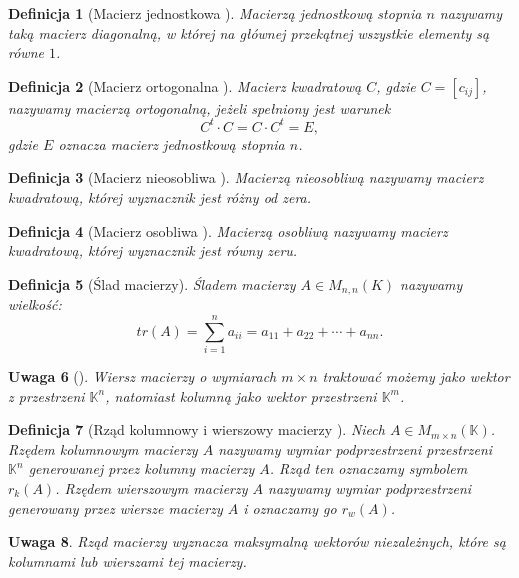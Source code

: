 \documentclass[12pt,a4paper]{report}
\newtheorem{df}{Definicja}[chapter]
\newtheorem{uwaga}[df]{Uwaga}
\newcommand{\setK}{\mathbb{K}}
\begin{document}
\begin{df}[Macierz jednostkowa {\citep[Sec 8.1]{alzega}}]
Macierzą jednostkową stopnia $n$ nazywamy taką macierz diagonalną, w której na głównej przekątnej wszystkie elementy są równe $1$.
\end{df}

\begin{df}[Macierz ortogonalna {\citep[Sec 14.3 Def. 14.26]{alzega}}]
Macierz kwadratową $C$, gdzie $C = [c_{ij}]$, nazywamy macierzą ortogonalną, jeżeli spełniony jest warunek
$$
C^t \cdot C = C \cdot C^t = E, 
$$
gdzie $E$ oznacza macierz jednostkową stopnia $n$.
\end{df}

\begin{df}[Macierz nieosobliwa {\citep[Sec 10.4]{alzega}}]
Macierzą nieosobliwą nazywamy macierz kwadratową, której wyznacznik jest różny od zera.
\end{df}

\begin{df}[Macierz osobliwa {\citep[Sec 10.4]{alzega}}]
Macierzą osobliwą nazywamy macierz kwadratową, której wyznacznik jest równy zeru.
\end{df}

\begin{df}[Ślad macierzy]
Śladem macierzy  $A\in M_{n,n}(K)$ nazywamy wielkość:
$$
tr(A) = \sum_{i=1}^n a_{ii} = a_{11} + a_{22} + \cdots + a_{nn}.
$$
\end{df}

\begin{uwaga}[{\citep[Sec 8.1]{alzega}}]
Wiersz macierzy o wymiarach $m \times n$ traktować możemy jako wektor z przestrzeni $\setK^n$, natomiast kolumną jako wektor przestrzeni $\setK^m$.
\end{uwaga}

\begin{df}[Rząd kolumnowy i wierszowy macierzy {\citep[Sec 8.1]{alzega}}]
Niech $A \in M_{m\times n}(\setK)$. Rzędem kolumnowym macierzy $A$ nazywamy wymiar podprzestrzeni przestrzeni $\setK^n$ generowanej przez kolumny macierzy $A$. Rząd ten oznaczamy symbolem $r_k(A)$. Rzędem wierszowym macierzy $A$ nazywamy wymiar podprzestrzeni generowany przez wiersze macierzy $A$ i oznaczamy go $r_w(A)$.
\end{df}

\begin{uwaga}
Rząd macierzy wyznacza maksymalną wektorów niezależnych, które są kolumnami lub wierszami tej macierzy.
\end{uwaga}
\end{document}
